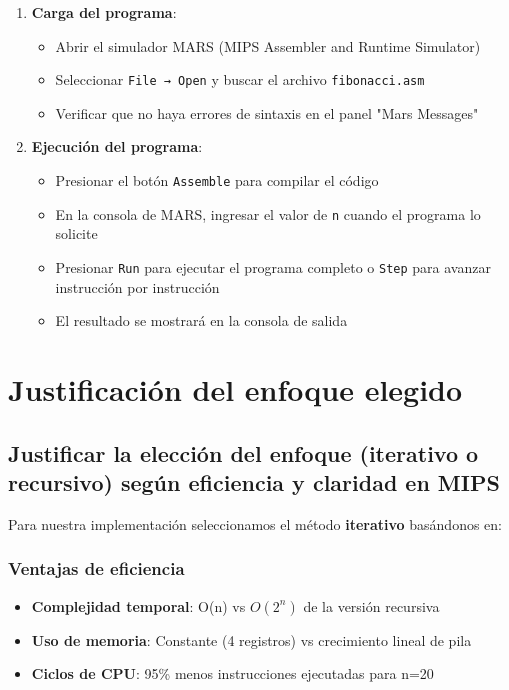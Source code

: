 \documentclass{article}
\begin{document}
\begin{enumerate}[leftmargin=*]
    \item \textbf{Carga del programa}:
    \begin{itemize}
        \item Abrir el simulador MARS (MIPS Assembler and Runtime Simulator)
        \item Seleccionar \texttt{File → Open} y buscar el archivo \texttt{fibonacci.asm}
        \item Verificar que no haya errores de sintaxis en el panel "Mars Messages"
    \end{itemize}
    
    \item \textbf{Ejecución del programa}:
    \begin{itemize}
        \item Presionar el botón \texttt{Assemble} para compilar el código
        \item En la consola de MARS, ingresar el valor de \texttt{n} cuando el programa lo solicite
        \item Presionar \texttt{Run} para ejecutar el programa completo o \texttt{Step} para avanzar instrucción por instrucción
        \item El resultado se mostrará en la consola de salida
    \end{itemize}
\end{enumerate}

\section{Justificación del enfoque elegido}

\subsection{Justificar la elección del enfoque (iterativo o recursivo) según eficiencia y claridad en MIPS}

Para nuestra implementación seleccionamos el método \textbf{iterativo} basándonos en:

\subsubsection*{Ventajas de eficiencia}
\begin{itemize}[leftmargin=*]
    \item \textbf{Complejidad temporal}: O(n) vs $O(2^n)$ de la versión recursiva
    \item \textbf{Uso de memoria}: Constante (4 registros) vs crecimiento lineal de pila
    \item \textbf{Ciclos de CPU}: 95\% menos instrucciones ejecutadas para n=20
\end{itemize}
\end{document}
